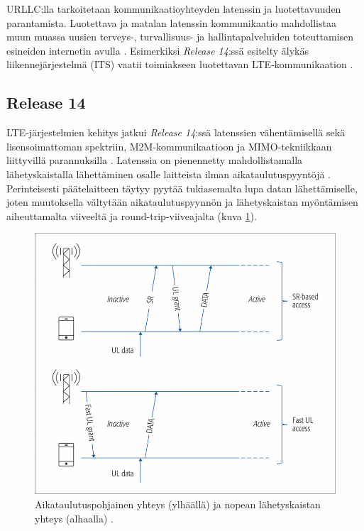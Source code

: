 \documentclass[finnish, 12pt, a4paper, elec, latin1, utf8, online]{aaltothesis}
\begin{document}
URLLC:lla tarkoitetaan kommunikaatioyhteyden latenssin ja luotettavuuden parantamista. Luotettava ja matalan latenssin kommunikaatio mahdollistaa muun muassa uusien terveys-, turvallisuus- ja hallintapalveluiden toteuttamisen esineiden internetin avulla \cite{hoymann2016lte}. Esimerkiksi \textit{Release 14}:ssä esitelty älykäs liikennejärjestelmä (ITS) vaatii toimiakseen luotettavan LTE-kommunikaation \cite{ericssonITS}.

\subsection{Release 14}

LTE-järjestelmien kehitys jatkui \textit{Release 14}:ssä \cite{release14} latenssien vähentämisellä sekä lisensoimattoman spektriin, M2M-kommunikaatioon ja MIMO-tekniikkaan liittyvillä parannuksilla \cite{ericssonRelease14}. Latenssia on pienennetty mahdollistamalla lähetyskaistalla lähettäminen osalle laitteista ilman aikataulutuspyyntöjä \cite{hoymann2016lte}. Perinteisesti päätelaitteen täytyy pyytää tukiasemalta lupa datan lähettämiselle, joten muutoksella vältytään aikataulutuspyynnön ja lähetyskaistan myöntämisen aiheuttamalta viiveeltä ja round-trip-viiveajalta (kuva \ref{fig:URLLC}).

\begin{figure}[h!]
    \centering
    \includegraphics[scale=0.4]{Images/URLLC.png}
    \caption{Aikataulutuspohjainen yhteys (ylhäällä) ja nopean lähetyskaistan yhteys (alhaalla) \cite{hoymann2016lte}.}
    \label{fig:URLLC}
\end{figure}
\end{document}
